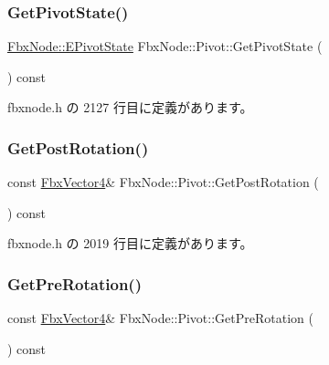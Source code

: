 \subsubsection{\texorpdfstring{Get\+Pivot\+State()}{GetPivotState()}}
{\footnotesize\ttfamily \hyperlink{class_fbx_node_a153fc75958227fc6728a2233b630b58a}{Fbx\+Node\+::\+E\+Pivot\+State} Fbx\+Node\+::\+Pivot\+::\+Get\+Pivot\+State (\begin{DoxyParamCaption}{ }\end{DoxyParamCaption}) const\hspace{0.3cm}{\ttfamily [inline]}}



 fbxnode.\+h の 2127 行目に定義があります。

\mbox{\label{class_fbx_node_1_1_pivot_aa3feddac1bf3ac072754b9135142278f}} 
\subsubsection{\texorpdfstring{Get\+Post\+Rotation()}{GetPostRotation()}}
{\footnotesize\ttfamily const \hyperlink{class_fbx_vector4}{Fbx\+Vector4}\& Fbx\+Node\+::\+Pivot\+::\+Get\+Post\+Rotation (\begin{DoxyParamCaption}{ }\end{DoxyParamCaption}) const\hspace{0.3cm}{\ttfamily [inline]}}



 fbxnode.\+h の 2019 行目に定義があります。

\mbox{\label{class_fbx_node_1_1_pivot_aeb33eb1d8182c36b1477016e0a1aad5a}} 
\subsubsection{\texorpdfstring{Get\+Pre\+Rotation()}{GetPreRotation()}}
{\footnotesize\ttfamily const \hyperlink{class_fbx_vector4}{Fbx\+Vector4}\& Fbx\+Node\+::\+Pivot\+::\+Get\+Pre\+Rotation (\begin{DoxyParamCaption}{ }\end{DoxyParamCaption}) const\hspace{0.3cm}{\ttfamily [inline]}}



